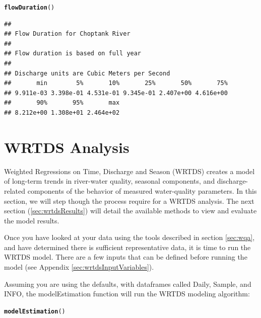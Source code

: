 \documentclass[a4paper,11pt]{article}\usepackage{graphicx, color}
\makeatletter
\newcommand{\hlfunctioncall}[1]{\textcolor[rgb]{0.501960784313725,0,0.329411764705882}{\textbf{#1}}}%
\newenvironment{kframe}{%
 \def\at@end@of@kframe{}%
 \ifinner\ifhmode%
  \def\at@end@of@kframe{\end{minipage}}%
  \begin{minipage}{\columnwidth}%
 \fi\fi%
 \def\FrameCommand##1{\hskip\@totalleftmargin \hskip-\fboxsep
 \colorbox{shadecolor}{##1}\hskip-\fboxsep
     \hskip-\linewidth \hskip-\@totalleftmargin \hskip\columnwidth}%
 \MakeFramed {\advance\hsize-\width
   \@totalleftmargin\z@ \linewidth\hsize
   \@setminipage}}%
 {\par\unskip\endMakeFramed%
 \at@end@of@kframe}
\newenvironment{knitrout}{}{} %
\makeatother
\begin{document}
\begin{knitrout}
\color{fgcolor}\begin{kframe}
\begin{alltt}
\hlfunctioncall{flowDuration}()
\end{alltt}
\begin{verbatim}
## 
## Flow Duration for Choptank River 
## 
## Flow duration is based on full year
## 
## Discharge units are Cubic Meters per Second
##       min        5%       10%       25%       50%       75% 
## 9.911e-03 3.398e-01 4.531e-01 9.345e-01 2.407e+00 4.616e+00 
##       90%       95%       max 
## 8.212e+00 1.308e+01 2.464e+02
\end{verbatim}
\end{kframe}
\end{knitrout}


\FloatBarrier
\section{WRTDS Analysis}
\label{sec:wrtds}
Weighted Regressions on Time, Discharge and Season (WRTDS) creates a model of long-term trends in river-water quality, seasonal components, and discharge-related components of the behavior of measured water-quality parameters. In this section, we will step though the process require for a WRTDS analysis. The next section (\ref{sec:wrtdsResults}) will detail the available methods to view and evaluate the model results. 

Once you have looked at your data using the tools described in section \ref{sec:wqa}, and have determined there is sufficient representative data, it is time to run the WRTDS model. There are a few inputs that can be defined before running the model (see Appendix \ref{sec:wrtdsInputVariables}).

Assuming you are using the defaults, with dataframes called Daily, Sample, and INFO, the modelEstimation function will run the WRTDS modeling algorithm:

\begin{knitrout}
\color{fgcolor}\begin{kframe}
\begin{alltt}
\hlfunctioncall{modelEstimation}()
\end{alltt}
\end{kframe}
\end{knitrout}
\end{document}
